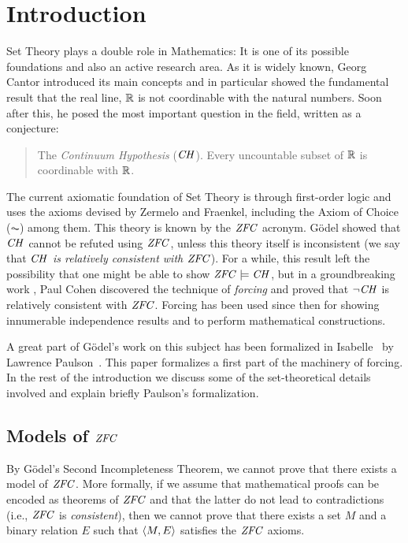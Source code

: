 \section{Introduction}\label{sec:introduction}
Set Theory plays a double role in Mathematics: It is one of its
possible foundations and also an active research area.
%
As it is widely known, Georg Cantor introduced its main concepts and in
particular showed the fundamental result that the real line, $\mathbb{R}$  is not
coordinable with the natural numbers. Soon after this, he posed the
most important question in the field, written as a conjecture:
\begin{quote}
  The \emph{Continuum Hypothesis} ($\mathit{CH}$). Every uncountable subset of $\mathbb{R}$ is
  coordinable with $\mathbb{R}$.
\end{quote}

The current axiomatic foundation of Set Theory is through first-order
logic and uses the axioms devised by Zermelo and Fraenkel, including
the Axiom of Choice ($\AC$) among them. This theory is known by the
$\mathit{ZFC}$ acronym. G\"odel \cite{godel-L} showed that $\mathit{CH}$ cannot be refuted using
$\mathit{ZFC}$, unless this theory itself is inconsistent (we say that
\emph{$\mathit{CH}$ is relatively consistent with $\mathit{ZFC}$}). For a while, this
result left the possibility that one might be able to show
$\mathit{ZFC}\models \mathit{CH}$, but in a groundbreaking work \cite{Cohen-CH-PNAS},
Paul Cohen discovered the technique of \emph{forcing} and proved that
$\neg\mathit{CH}$ is relatively consistent with $\mathit{ZFC}$. Forcing has been used
since then for showing innumerable independence results and to perform
mathematical constructions.

A great part of G\"odel's work on this subject has been formalized in
Isabelle~\cite{Isabelle} by Lawrence Paulson~\cite{paulson_2003}. This paper formalizes
a first part of the machinery of forcing. In the rest of the
introduction we discuss some of the set-theoretical details involved
and explain briefly Paulson's formalization.

\subsection{Models of $\mathit{ZFC}$}
By G\"odel's Second Incompleteness Theorem, we cannot  prove that
there exists a model of $\mathit{ZFC}$. More formally, if we assume that
mathematical proofs can be encoded as theorems of $\mathit{ZFC}$ and that
the latter do not lead to contradictions (i.e., $\mathit{ZFC}$ is
\emph{consistent}), then we cannot prove that there exists a set $M$
and a binary relation $E$ such that $\langle M,E\rangle$ satisfies the $\mathit{ZFC}$
axioms.

